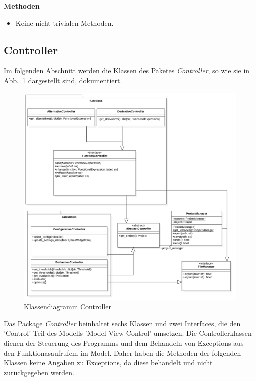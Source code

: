 \documentclass{article}
\begin{document}
\textbf{Methoden}
\begin{itemize}\setlength\itemsep{3em}
\item[] Keine nicht-trivialen Methoden.
\end{itemize}
\newpage
\subsection{Controller}

Im folgenden Abschnitt werden die Klassen des Paketes \emph{Controller}, so wie sie in Abb.~\ref{fig:ControllerKlassendiagramm} dargestellt sind, dokumentiert.

\begin{figure}[H]%
    \centering
    \includegraphics[width=13cm]{entwurf/Floriane/ControllerKlassendiagramm.png}
    \caption{Klassendiagramm Controller}
    \label{fig:ControllerKlassendiagramm}
\end{figure}

Das Package \textit{Controller} beinhaltet sechs Klassen und zwei Interfaces, die den 'Control'-Teil des Modells 'Model-View-Control' umsetzen. Die Controllerklassen dienen der Steuerung des Programms und dem Behandeln von Exceptions aus den Funktionasaufrufem im Model. Daher haben die Methoden der folgenden Klassen keine Angaben zu Exceptions, da diese behandelt und nicht zurückgegeben werden.
\end{document}
